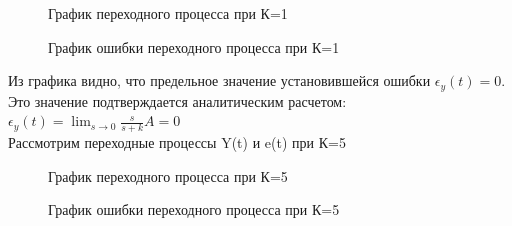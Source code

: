 \documentclass[a4paper, 11pt]{article}
\begin{document}
\begin{figure}[h!]
    \caption{График переходного процесса при К=1}
    \label{two}
\end{figure}
\begin{figure}[h!]
    \caption{График ошибки переходного процесса при К=1}
    \label{tree}
\end{figure}

\newpage

Из графика видно, что предельное значение установившейся ошибки $\epsilon_y(t)=0$. Это значение подтверждается аналитическим расчетом: $\epsilon_y(t)=\lim_{s\to0}\frac{s}{s+k}A=0$\\

Рассмотрим переходные процессы Y(t) и e(t) при К=5

\begin{figure}[h!]
    \caption{График переходного процесса при К=5}
    \label{two}
\end{figure}
\begin{figure}[h!]
    \caption{График ошибки переходного процесса при К=5}
    \label{tree}
\end{figure}
\end{document}
